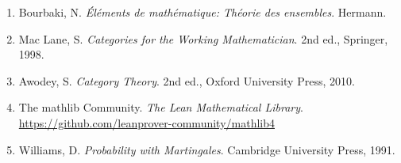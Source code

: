 \documentclass{ltjsarticle}
\theoremstyle{definition}
\begin{document}
\begin{enumerate}
  \item Bourbaki, N. \textit{Éléments de mathématique: Théorie des ensembles}. Hermann.
  \item Mac Lane, S. \textit{Categories for the Working Mathematician}. 2nd ed., Springer, 1998.
  \item Awodey, S. \textit{Category Theory}. 2nd ed., Oxford University Press, 2010.
  \item The mathlib Community. \textit{The Lean Mathematical Library}. \url{https://github.com/leanprover-community/mathlib4}
  \item Williams, D. \textit{Probability with Martingales}. Cambridge University Press, 1991.
\end{enumerate}
\end{document}
